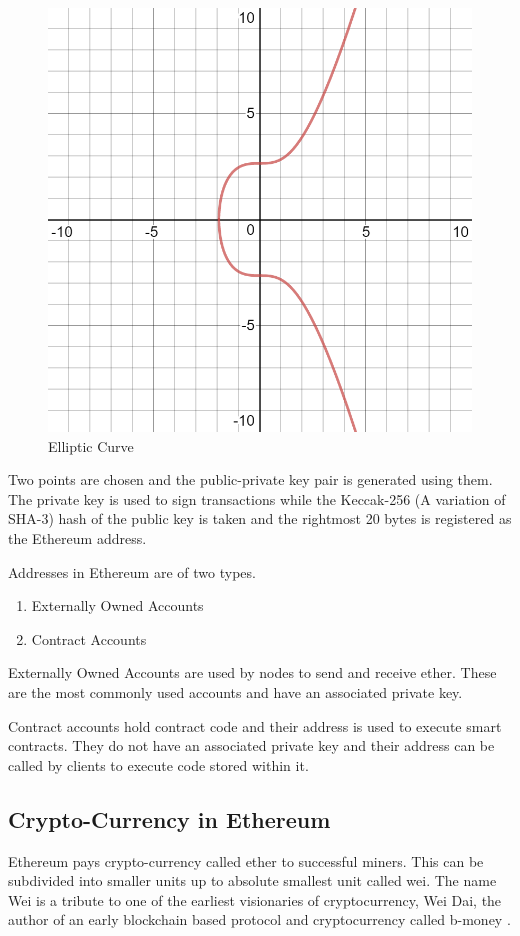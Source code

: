 \documentclass[11pt,openright]{report}
\begin{document}
\begin{figure}
    \centering
    \includegraphics[scale=0.5]{images/ecc.png}
    \caption{Elliptic Curve}
    \label{fig:elliptic_curve}
\end{figure}

Two points are chosen and the public-private key pair is generated using them. The private key is used to sign transactions while the Keccak-256 (A variation of SHA-3) hash of the public key is taken and the rightmost 20 bytes is registered as the Ethereum address.

Addresses in Ethereum are of two types.
\begin{enumerate}
    \item Externally Owned Accounts
    \item Contract Accounts
\end{enumerate}

Externally Owned Accounts are used by nodes to send and receive ether. These are the most commonly used accounts and have an associated private key.

Contract accounts hold contract code and their address is used to execute smart contracts. They do not have an associated private key and their address can be called by clients to execute code stored within it.

\subsection{Crypto-Currency in Ethereum}
Ethereum pays crypto-currency called ether to successful miners. This can be subdivided into smaller units up to absolute smallest unit called wei. The name Wei is a tribute to one of the earliest visionaries of cryptocurrency, Wei Dai, the author of an early blockchain based protocol and cryptocurrency called b-money \cite{dai1998bmoney}.
\end{document}
